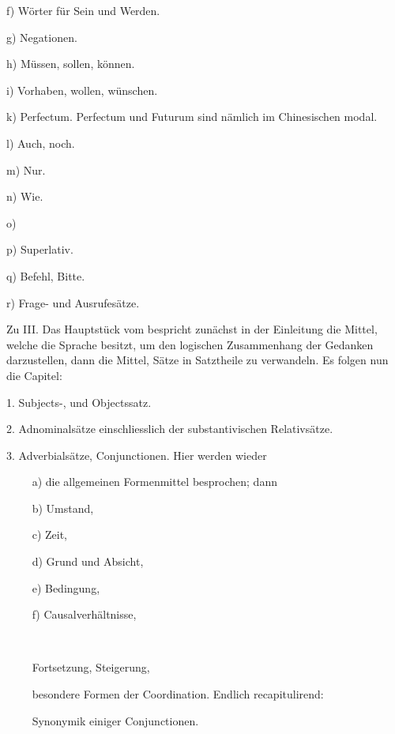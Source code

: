 f) Wörter für Sein und Werden.

g) Negationen.

h) Müssen, sollen, können.

i) Vorhaben, wollen, wünschen.

k) Perfectum. Perfectum und Futurum sind nämlich im Chinesischen modal.

l) Auch, noch.

m) Nur.

\label{fp.108}

n) Wie.

o) 

p) Superlativ.

q) Befehl, Bitte.

r) Frage- und Ausrufesätze.

Zu III. Das Hauptstück vom  bespricht zunächst in der Einleitung die Mittel, welche \label{sp.104} die Sprache besitzt, um den logischen Zusammenhang der Gedanken darzustellen, dann die Mittel, Sätze in Satztheile zu verwandeln. Es folgen nun die Capitel:

1. Subjects-,  und Objectssatz.

2. Adnominalsätze einschliesslich der substantivischen Relativsätze.

3. Adverbialsätze, Conjunctionen. Hier werden wieder

~~~~ a) die allgemeinen Formenmittel besprochen; dann

~~~~ b) Umstand,

~~~~ c) Zeit,

~~~~ d) Grund und Absicht,

~~~~ e) Bedingung,

~~~~ f) Causalverhältnisse,

~~~~ 

~~~~  Fortsetzung, Steigerung,

~~~~  besondere Formen der Coordination. Endlich recapitulirend:

~~~~  Synonymik einiger Conjunctionen.

